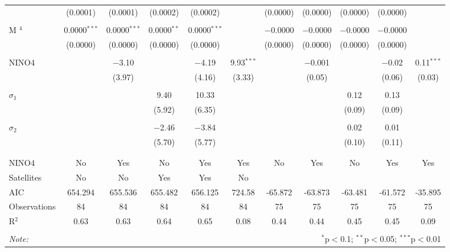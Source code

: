 \begin{table}[H]
\begin{tabular}{@{\extracolsep{0.1pt}}lcccccccccc}
  & (0.0001) & (0.0001) & (0.0002) & (0.0002) &  & (0.0000) & (0.0000) & (0.0000) & (0.0000) &  \\ 
  & & & & & & & & & & \\ 
 M $^4$ & 0.0000$^{***}$ & 0.0000$^{***}$ & 0.0000$^{**}$ & 0.0000$^{***}$ &  & $-$0.0000 & $-$0.0000 & $-$0.0000 & $-$0.0000 &  \\ 
  & (0.0000) & (0.0000) & (0.0000) & (0.0000) &  & (0.0000) & (0.0000) & (0.0000) & (0.0000) &  \\ 
  & & & & & & & & & & \\ 
 NINO4 &  & $-$3.10 &  & $-$4.19 & 9.93$^{***}$ &  & $-$0.001 &  & $-$0.02 & 0.11$^{***}$ \\ 
  &  & (3.97) &  & (4.16) & (3.33) &  & (0.05) &  & (0.06) & (0.03) \\ 
  & & & & & & & & & & \\ 
 $\sigma_1$ &  &  & 9.40 & 10.33 &  &  &  & 0.12 & 0.13 &  \\ 
  &  &  & (5.92) & (6.35) &  &  &  & (0.09) & (0.09) &  \\ 
  & & & & & & & & & & \\ 
 $\sigma_2$ &  &  & $-$2.46 & $-$3.84 &  &  &  & 0.02 & 0.01 &  \\ 
  &  &  & (5.70) & (5.77) &  &  &  & (0.10) & (0.11) &  \\ 
  & & & & & & & & & & \\ 
\hline \\[-1.8ex] 
NINO4 & No & Yes & No & Yes & Yes & No & Yes & No & Yes & Yes \\ 
Satellites & No & No & Yes & Yes & No &  &  &  &  &  \\ 
AIC & 654.294 & 655.536 & 655.482 & 656.125 & 724.58 & -65.872 & -63.873 & -63.481 & -61.572 & -35.895 \\ 
Observations & 84 & 84 & 84 & 84 & 84 & 75 & 75 & 75 & 75 & 75 \\ 
R$^{2}$ & 0.63 & 0.63 & 0.64 & 0.65 & 0.08 & 0.44 & 0.44 & 0.45 & 0.45 & 0.09 \\ 
\hline 
\hline \\[-1.8ex] 
\textit{Note:}  & \multicolumn{10}{r}{$^{*}$p$<$0.1; $^{**}$p$<$0.05; $^{***}$p$<$0.01} \\ 
\end{tabular} 
\end{table} 
